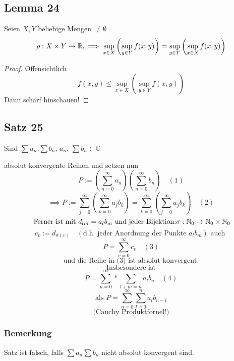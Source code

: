 \subsection{Lemma 24}

Seien $X,Y$ beliebige Mengen $\neq \emptyset$
\[\rho:X \times Y \to \mathbb{R}, \implies \sup_{x \in X} \left( \sup_{y \in Y} f(x,y) \right) = \sup_{y \in Y} \left( \sup_{x \in X} f(x,y) \right) \]

\begin{proof}

Offensichtlich
\[f(x,y) \leq \sup_{x \in X} \left( \sup_{y \in Y} f(x,y) \right)\]
Dann scharf hinschauen! %

\end{proof}

\subsection{Satz 25}

Sind $\sum a_n$,$\sum b_n$, \quad $a_n$, $\sum b_n \in \mathbb{C}$

absolut konvergente Reihen und setzen nun
\[\boxed{P:= \left( \sum_{n=0}^\infty a_n \right)\left( \sum_{n=0}^\infty b_n \right)} \quad (1)\]
\[\implies \boxed{P := \sum_{j=0}^\infty \left( \sum_{k=0}^\infty  a_j b_k \right) = \sum_{k=0}^\infty \left( \sum_{j=0}^\infty  a_j b_k \right)} \quad (2)\]
\[\text{ Ferner ist mit } d_{lm} = a_l b_m \text{ und jeder Bijektion:} \sigma:\mathbb{N}_0 \to \mathbb{N}_0 \times \mathbb{N}_0 \]
\[c_v := d_{\sigma(v)} \quad (\text{d.h. jeder Anordnung der Punkte } a_l b_m) \text{ auch }\]
\[\boxed{P= \sum_{v=0}^\infty c_v} \quad (3)\]
\[\text{und die Reihe in (3) ist absolut konvergent.}\]
\[\text{Insbesondere ist}\]
\[\boxed{P=\sum_{n=0}^\infty * \sum_{l+m=n} a_l b_n } \quad (4)\]
\[\text{als } P=\sum_{n=0}^\infty \sum_{l=0}^n a_l b_{n-l}\]
\[\text{(Cauchy Produktfornel!)}\]

\subsubsection{Bemerkung}

Satz ist falsch, falls $\sum a_n \sum b_n$ nicht absolut konvergent sind.

